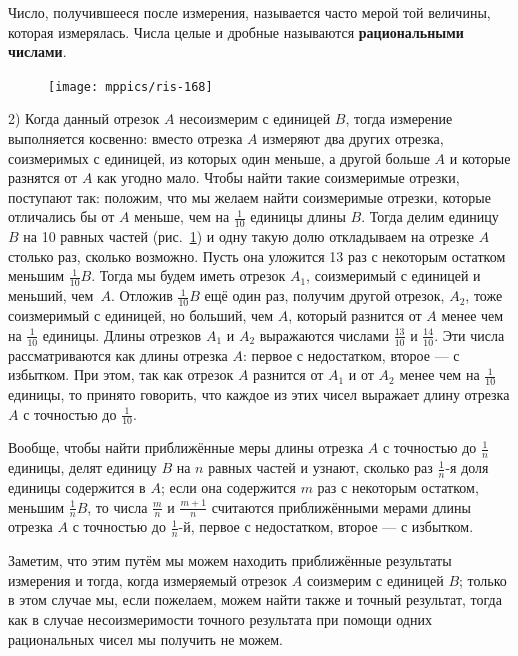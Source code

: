 \documentclass[oneside]{book}
\begin{document}
Число, получившееся после измерения, называется часто мерой той величины, которая измерялась.
Числа целые и дробные называются \textbf{рациональными числами}.

\begin{figure}[h!]
\centering
\texttt{[image: mppics/ris-168]}
\caption{}\label{1938/ris-168}
\end{figure}

2) Когда данный отрезок $A$ несоизмерим с единицей $B$, тогда измерение выполняется косвенно:
вместо отрезка $A$ измеряют два других отрезка, соизмеримых с единицей, из которых один меньше, а другой больше $A$ и которые разнятся от $A$ как угодно мало.
Чтобы найти такие соизмеримые отрезки, поступают так:
положим, что мы желаем найти соизмеримые отрезки, которые отличались бы от $A$ меньше, чем на
$\tfrac1{10}$ единицы длины $B$.
Тогда делим единицу $B$ на 10 равных частей (рис.~\ref{1938/ris-168}) и одну такую долю откладываем на отрезке $A$ столько раз, сколько возможно.
Пусть она уложится 13 раз с некоторым остатком меньшим $\tfrac1{10}B$.
Тогда мы будем иметь отрезок $A_1$, соизмеримый с единицей и меньший, чем~$A$.
Отложив $\tfrac1{10}B$ ещё один раз, получим другой отрезок, $A_2$, тоже соизмеримый с единицей, но больший, чем $A$, который разнится от $A$ менее чем на $\tfrac1{10}$ единицы.
Длины отрезков $A_1$ и $A_2$ выражаются числами $\tfrac{13}{10}$ и $\tfrac{14}{10}$.
Эти числа рассматриваются как  длины отрезка $A$:
первое с недостатком, второе — с избытком.
При этом, так как отрезок $A$ разнится от $A_1$ и от $A_2$ менее чем на $\tfrac1{10}$ единицы, то принято говорить, что каждое из этих чисел выражает длину отрезка $A$ с точностью до $\tfrac1{10}$.

Вообще, чтобы найти приближённые меры длины отрезка $A$ с точностью до $\tfrac1n$ единицы, делят единицу $B$ на $n$ равных частей и узнают, сколько раз $\tfrac1n$-я доля единицы содержится в $A$;
если она содержится $m$ раз с некоторым остатком, меньшим $\tfrac1n B$, то числа $\tfrac mn$ и $\tfrac {m+1}n$ считаются приближёнными мерами длины отрезка $A$ с точностью до $\tfrac1n$-й, первое с недостатком, второе — с избытком.

Заметим, что этим путём мы можем находить приближённые результаты измерения и тогда, когда измеряемый отрезок $A$ соизмерим с единицей $B$;
только в этом случае мы, если пожелаем, можем найти также и точный результат, тогда как в случае несоизмеримости точного результата при помощи одних рациональных чисел мы получить не можем.
\end{document}
